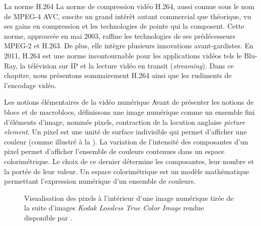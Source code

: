 \begin{chapter}{La norme H.264}
\label{chap-h264}
La norme de compression vidéo H.264, aussi connue sous le nom
de MPEG-4 AVC, suscite un grand intérêt autant commercial que théorique, vu ses
gains en compression et les technologies de pointe qui la composent. Cette
norme, approuvée en mai 2003, raffine les technologies de ses prédécesseurs
MPEG-2 et H.263. De plus, elle intègre plusieurs innovations avant-gardistes. En
2011, H.264 est une norme incontournable pour les applications vidéos tels le
Blu-Ray, la télévision sur IP et la lecture vidéo en transit
(\textit{streaming}). Dans ce chapitre, nous présentons sommairement H.264 ainsi
que les rudiments de l'encodage vidéo.

\begin{section}{Les notions élémentaires de la vidéo numérique}
Avant de présenter les notions de blocs et de macroblocs, définissons une image
numérique comme un ensemble fini d'éléments d'image, nommés pixels, contraction
de la locution anglaise \textit{picture element}. Un pixel est une unité de
surface indivisible qui permet d'afficher une couleur (comme illustré à la
). La variation de l'intensité des composantes d'un
pixel permet d'afficher l'ensemble de couleurs contenues dans un espace
colorimétrique. Le choix de ce dernier détermine les composantes, leur nombre et
la portée de leur valeur. Un espace colorimétrique est un modèle mathématique
permettant l'expression numérique d'un ensemble de couleurs.

\begin{figure}
	\centering 
	\caption[Visualisation des pixels à l'intérieur d'une image numérique]
	{Visualisation des pixels à l'intérieur d'une image numérique tirée de la suite d'images \textit{Kodak Lossless True Color Image} rendue disponible par
\citet{Kodak1999}.}
	\label{fig-PixelLighthouse}
\end{figure}


\end{section}
\end{chapter}
